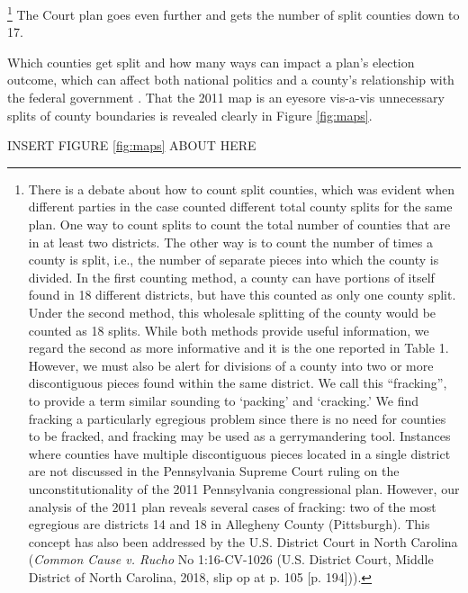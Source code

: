         \footnote{There is a debate about how to count split counties, which was evident when different parties in the case counted different total county splits for the same plan. One way to count splits to count the total number of counties that are in at least two districts. The other way is to count the number of times a county is split, i.e., the number of separate pieces into which the county is divided. In the first counting method, a county can have portions of itself found in 18 different districts, but have this counted as only one county split. Under the second method, this wholesale splitting of the county would be counted as 18 splits. While both methods provide useful information, we regard the second as more informative and it is the one reported in Table 1. However, we must also be alert for divisions of a county into two or more discontiguous pieces found within the same district. We call this ``fracking'', to provide a term similar sounding to ‘packing’ and ‘cracking.’ We find fracking a particularly egregious problem since there is no need for counties to be fracked, and fracking may be used as a gerrymandering tool. Instances where counties have multiple discontiguous pieces located in a single district are not discussed in the Pennsylvania Supreme Court ruling on the unconstitutionality of the 2011 Pennsylvania congressional plan. However, our analysis of the 2011 plan reveals several cases of fracking: two of the most egregious are districts 14 and 18 in Allegheny County (Pittsburgh). This concept has also been addressed by the U.S. District Court in North Carolina (\textit{Common Cause v. Rucho} No 1:16-CV-1026 (U.S. District Court, Middle District of North Carolina, 2018, slip op at p. 105 [p. 194])).}
    The Court plan goes even further and gets the number of split counties down to 17.
\par
    Which counties get split and how many ways can impact a plan’s election outcome, which can affect both national politics and a county's relationship with the federal government \citep{Ansolabehere2002a}. That the 2011 map is an eyesore vis-a-vis unnecessary splits of county boundaries is revealed clearly in Figure \ref{fig:maps}.
\par
    
        \begin{center} INSERT FIGURE \ref{fig:maps} ABOUT HERE \end{center}
\par
%
